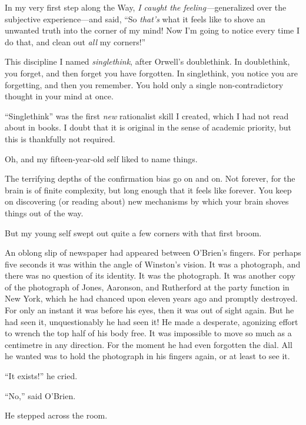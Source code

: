 {
 In my very first step along the Way, \textit{I caught the
feeling---}generalized over the subjective experience---and said,
``So \textit{that's} what it feels
like to shove an unwanted truth into the corner of my mind! Now
I'm going to notice every time I do that, and clean out
\textit{all} my corners!''}

{
 This discipline I named \textit{singlethink}, after
Orwell's doublethink. In doublethink, you forget, and
then forget you have forgotten. In singlethink, you notice you are
forgetting, and then you remember. You hold only a single
non-contradictory thought in your mind at once.}

{
 ``Singlethink'' was the first
\textit{new} rationalist skill I created, which I had not read about in
books. I doubt that it is original in the sense of academic priority,
but this is thankfully not required.}

{
 Oh, and my fifteen-year-old self liked to name things.}

{
 The terrifying depths of the confirmation bias go on and on. Not
forever, for the brain is of finite complexity, but long enough that it
feels like forever. You keep on discovering (or reading about) new
mechanisms by which your brain shoves things out of the way.}

{
 But my young self swept out quite a few corners with that first
broom.}

\myendsectiontext


{
 An oblong slip of newspaper had appeared between
O'Brien's fingers. For perhaps five
seconds it was within the angle of Winston's vision. It
was a photograph, and there was no question of its identity. It was the
photograph. It was another copy of the photograph of Jones, Aaronson,
and Rutherford at the party function in New York, which he had chanced
upon eleven years ago and promptly destroyed. For only an instant it
was before his eyes, then it was out of sight again. But he had seen
it, unquestionably he had seen it! He made a desperate, agonizing
effort to wrench the top half of his body free. It was impossible to
move so much as a centimetre in any direction. For the moment he had
even forgotten the dial. All he wanted was to hold the photograph in
his fingers again, or at least to see it.}

{
 ``It exists!'' he cried.}

{
 ``No,'' said
O'Brien.}

{
 He stepped across the room.}

